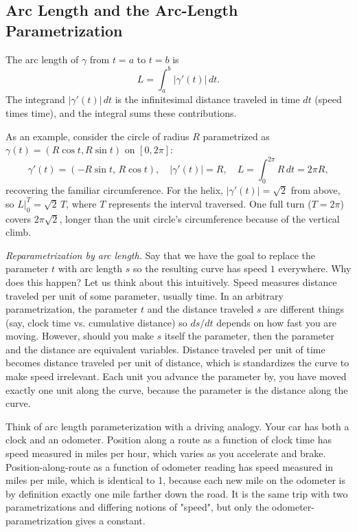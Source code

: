 \documentclass{article}
\begin{document}
\subsection{Arc Length and the Arc-Length Parametrization}

The arc length of $\gamma$ from $t = a$ to $t = b$ is
$$L = \int_a^b |\gamma'(t)|\, dt.$$
The integrand $|\gamma'(t)|\, dt$ is the infinitesimal distance traveled in time $dt$ (speed times time), and the integral sums these contributions.

As an example, consider the circle of radius $R$ parametrized as $\gamma(t) = (R \cos t, R \sin t)$ on $[0,2\pi]$:
$$\gamma'(t) = (-R \sin t,\, R \cos t), \quad |\gamma'(t)| = R, \quad L = \int_0^{2\pi} R\, dt = 2\pi R,$$
recovering the familiar circumference. For the helix, $|\gamma'(t)| = \sqrt{2}$ from above, so $L\big|_0^T = \sqrt{2}\, T$, where $T$ represents the interval traversed. One full turn ($T = 2\pi$) covers $2\pi\sqrt{2}$, longer than the unit circle's circumference because of the vertical climb.

\textit{Reparametrization by arc length.} Say that we have the goal to replace the parameter $t$ with arc length $s$ so the resulting curve has speed $1$ everywhere. Why does this happen? Let us think about this intuitively. Speed measures distance traveled per unit of some parameter, usually time. In an arbitrary parametrization, the parameter $t$ and the distance traveled $s$ are different things (say, clock time vs. cumulative distance) so $ds/dt$ depends on how fast you are moving. However, should you make $s$ itself the parameter, then the parameter and the distance are equivalent variables. Distance traveled per unit of time becomes distance traveled per unit of distance, which is standardizes the curve to make speed irrelevant. Each unit you advance the parameter by, you have moved exactly one unit along the curve, because the parameter is the distance along the curve.

Think of arc length parameterization with a driving analogy. Your car has both a clock and an odometer. Position along a route as a function of clock time has speed measured in miles per hour, which varies as you accelerate and brake. Position-along-route as a function of odometer reading has speed measured in miles per mile, which is identical to 1, because each new mile on the odometer is by definition exactly one mile farther down the road. It is the same trip with two parametrizations and differing notions of "speed", but only the odometer-parametrization gives a constant.
\end{document}
